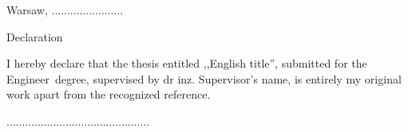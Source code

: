 \documentclass[a4paper,11pt,twoside]{report}
\theoremstyle{definition}
\renewcommand{\title}{English title}
\newcommand{\type}{Engineer} %
\newcommand{\supervisor}{dr inz. Supervisor's name}
\begin{document}
\sloppy


\begin{abstract}

\begin{center}
\title
\end{center}

Lorem ipsum dolor sit amet, consetetur sadipscing elitr, sed diam nonumyeirmod tempor invidunt ut labore et dolore magna aliquyam erat, sed diamvoluptua. At vero eos et accusam et justo duo dolores et ea rebum. Stet clita kasd gubergren, no sea takimata sanctus est Lorem ipsum dolor sit amet.

Lorem ipsum dolor sit amet, consetetur sadipscing elitr, sed diam nonumyeirmod tempor invidunt ut labore et dolore magna aliquyam erat, sed diamvoluptua. At vero eos et accusam et justo duo dolores et ea rebum. Stet clita kasd gubergren, no sea takimata sanctus est Lorem ipsum dolor sit amet.\\

\noindent \textbf{Keywords:} keyword1, keyword2, ...
\end{abstract}


\null\thispagestyle{empty}\newpage

\null \hfill Warsaw, ....................... %


\par\vspace{5cm}

\begin{center}
Declaration
\end{center}

I hereby declare that the thesis entitled ,,\title '', submitted for the \type ~degree, supervised  by \supervisor , is entirely my original work apart from the recognized reference.
\vspace{2cm}

\begin{flushright}
  \begin{minipage}{50mm}
    \begin{center}
      ..............................................

    \end{center}
  \end{minipage}
\end{flushright}

\thispagestyle{empty}
\newpage

\null\thispagestyle{empty}\newpage
\end{document}
